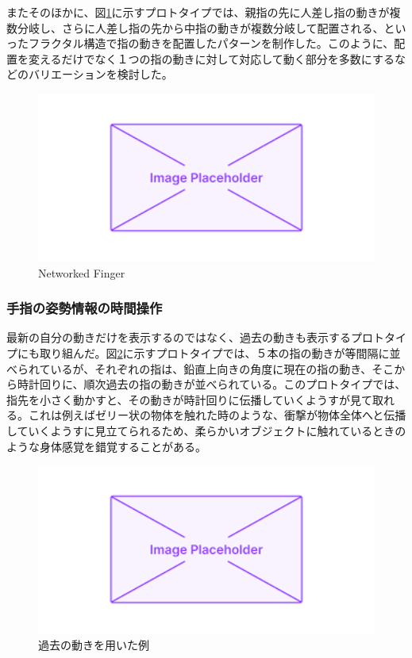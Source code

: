 またそのほかに、図\ref{fig:fractal_finger}に示すプロトタイプでは、親指の先に人差し指の動きが複数分岐し、さらに人差し指の先から中指の動きが複数分岐して配置される、といったフラクタル構造で指の動きを配置したパターンを制作した。このように、配置を変えるだけでなく１つの指の動きに対して対応して動く部分を多数にするなどのバリエーションを検討した。

\begin{figure}[H]
  \centering
  \includegraphics[width=15cm]{img/placeholder.png}
  \caption{Networked Finger}
  \label{fig:fractal_finger}
\end{figure}
\subsubsection*{手指の姿勢情報の時間操作}
最新の自分の動きだけを表示するのではなく、過去の動きも表示するプロトタイプにも取り組んだ。図\ref{fig:prototype_delay}に示すプロトタイプでは、５本の指の動きが等間隔に並べられているが、それぞれの指は、鉛直上向きの角度に現在の指の動き、そこから時計回りに、順次過去の指の動きが並べられている。このプロトタイプでは、指先を小さく動かすと、その動きが時計回りに伝播していくようすが見て取れる。これは例えばゼリー状の物体を触れた時のような、衝撃が物体全体へと伝播していくようすに見立てられるため、柔らかいオブジェクトに触れているときのような身体感覚を錯覚することがある。

\begin{figure}[H]
  \centering
  \includegraphics[width=15cm]{img/placeholder.png}
  \caption{過去の動きを用いた例}
  \label{fig:prototype_delay}
\end{figure}
